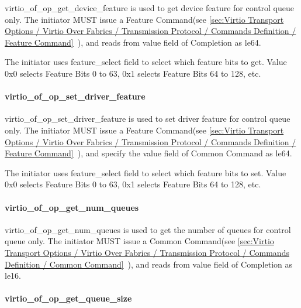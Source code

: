 virtio_of_op_get_device_feature is used to get device feature for control queue only. The initiator MUST issue a Feature Command(see \ref{sec:Virtio Transport Options / Virtio Over Fabrics / Transmission Protocol / Commands Definition / Feature Command}~), and reads from value field of Completion as le64.

The initiator uses feature_select field to select which feature bits to get. Value 0x0 selects Feature Bits 0 to 63, 0x1 selects Feature Bits 64 to 128, etc.

\paragraph{virtio_of_op_set_driver_feature}\label{sec:Virtio Transport Options / Virtio Over Fabrics / Transmission Protocol / Opcodes Definition / virtio_of_op_set_driver_feature}

virtio_of_op_set_driver_feature is used to set driver feature for control queue only. The initiator MUST issue a Feature Command(see \ref{sec:Virtio Transport Options / Virtio Over Fabrics / Transmission Protocol / Commands Definition / Feature Command}~), and specify the value field of Common Command as le64.

The initiator uses feature_select field to select which feature bits to set. Value 0x0 selects Feature Bits 0 to 63, 0x1 selects Feature Bits 64 to 128, etc.

\paragraph{virtio_of_op_get_num_queues}\label{sec:Virtio Transport Options / Virtio Over Fabrics / Transmission Protocol / Opcodes Definition / virtio_of_op_get_num_queues}

virtio_of_op_get_num_queues is used to get the number of queues for control queue only. The initiator MUST issue a Common Command(see \ref{sec:Virtio Transport Options / Virtio Over Fabrics / Transmission Protocol / Commands Definition / Common Command}~), and reads from value field of Completion as le16.

\paragraph{virtio_of_op_get_queue_size}\label{sec:Virtio Transport Options / Virtio Over Fabrics / Transmission Protocol / Opcodes Definition / virtio_of_op_get_queue_size}

